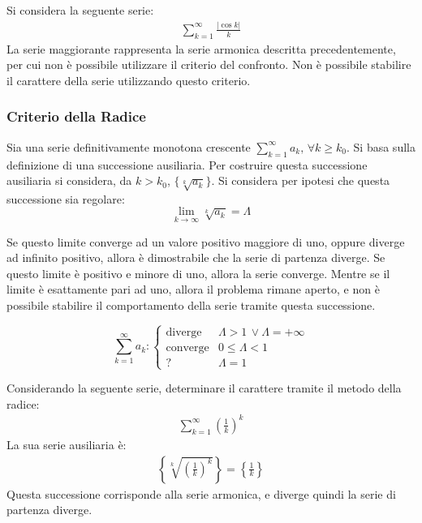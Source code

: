 \documentclass{article}
\numberwithin{equation}{subsection}
\begin{document}
Si considera la seguente serie:
\begin{gather*}
    \displaystyle\sum_{k=1}^\infty\frac{|\cos k|}{k}
\end{gather*}
La serie maggiorante rappresenta la serie armonica descritta precedentemente, per cui non è possibile utilizzare il criterio del confronto. Non è possibile stabilire il carattere della serie utilizzando questo criterio. 

\subsubsection{Criterio della Radice}

Sia una serie definitivamente monotona crescente $\sum_{k=1}^\infty a_k,\,\forall k\geq k_0$. 
Si basa sulla definizione di una successione ausiliaria. Per costruire questa successione ausiliaria si considera, da $k>k_0$, $\{\sqrt[k]{a_k}\}$. Si considera per ipotesi che questa successione sia regolare:
\begin{equation*}
    \lim_{k\to\infty}\sqrt[k]{a_k}=\Lambda
\end{equation*}

Se questo limite converge ad un valore positivo maggiore di uno, oppure diverge ad infinito positivo, allora è dimostrabile che la serie di partenza diverge. 
Se questo limite è positivo e minore di uno, allora la serie converge. Mentre se il limite è esattamente pari ad uno, allora il problema rimane aperto, e non è possibile stabilire il comportamento della serie tramite questa successione. 

\begin{equation}
    \displaystyle\sum_{k=1}^\infty a_k:\begin{cases}
        \text{diverge}&\Lambda > 1\,\lor\Lambda=+\infty\\
        \text{converge}&0\leq\Lambda<1\\
        ?&\Lambda=1
    \end{cases}
\end{equation}

Considerando la seguente serie, determinare il carattere tramite il metodo della radice:
\begin{gather*}
    \displaystyle\sum_{k=1}^\infty\left(\frac{1}{k}\right)^k
\end{gather*}
La sua serie ausiliaria è:
\begin{gather*}
    \displaystyle\left\{\sqrt[k]{\left(\frac{1}{k}\right)^{k}}\right\}=\left\{\frac{1}{k}\right\}
\end{gather*}
Questa successione corrisponde alla serie armonica, e diverge quindi la serie di partenza diverge. 
\end{document}
